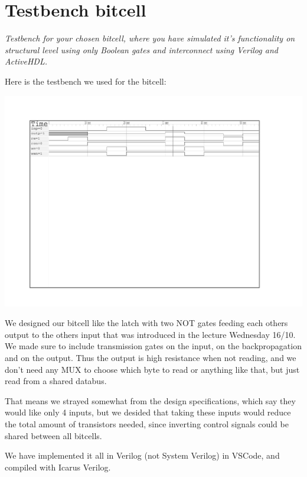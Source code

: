 \section{Testbench bitcell}
\textit{Testbench for your chosen bitcell, where you have simulated it’s functionality on structural level using only Boolean gates and interconnect using Verilog and ActiveHDL.}

Here is the testbench we used for the bitcell:

\includegraphics[width=\textwidth]{verilog_mem8x8_latch/simple_testbenches/bitcell.pdf}

We designed our bitcell like the latch with two NOT gates feeding each others output to the others input that was introduced in the lecture Wednesday 16/10. We made sure to include transmission gates on the input, on the backpropagation and on the output. Thus the output is high resistance when not reading, and we don't need any MUX to choose which byte to read or anything like that, but just read from a shared databus.

That means we strayed somewhat from the design specifications, which say they would like only 4 inputs, but we desided that taking these inputs would reduce the total amount of transistors needed, since inverting control signals could be shared between all bitcells.

We have implemented it all in Verilog (not System Verilog) in VSCode, and compiled with Icarus Verilog.